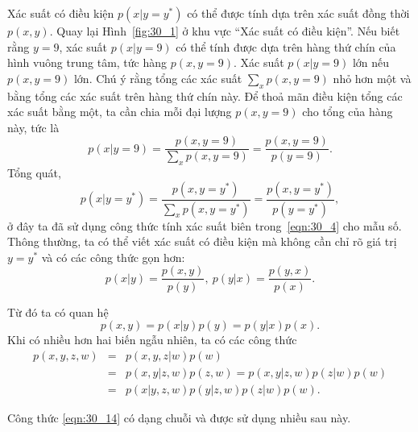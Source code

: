 Xác suất có điều kiện $p(x | y = y^*)$ có thể được tính dựa trên xác suất đồng
thời $p(x, y)$. Quay lại Hình~\ref{fig:30_1} ở khu vực ``Xác suất có điều
kiện''. Nếu biết rằng $y = 9$, xác suất $p(x | y = 9)$ có thể tính được dựa trên
hàng thứ chín của hình vuông trung tâm, tức hàng $p(x, y = 9)$. Xác suất $p(x | y =
9) $ lớn nếu $p(x, y= 9)$ lớn. Chú ý rằng tổng các xác suất $\sum_{x} p(x,
y = 9)$ nhỏ hơn một và bằng tổng các xác suất trên hàng thứ chín này. Để thoả
mãn điều kiện tổng các xác suất bằng một, ta cần chia mỗi đại lượng $p(x, y =
9)$ cho tổng của hàng này, tức là
\begin{equation}
p(x | y = 9) =\frac{p(x, y = 9)}{\sum \limits_x p(x, y = 9)} =
\frac{p(x, y = 9)}{p(y = 9)}.
\end{equation}
Tổng quát,
\begin{equation}
\label{eqn:30_9}
\displaystyle
p(x|y = y^*) = \frac{p(x, y = y^*)}{\sum \limits_{x} p(x, y = y^*)} =
\frac{p(x, y = y^*)}{p(y = y^*)},
\end{equation}
ở đây ta đã sử dụng công thức tính xác suất biên trong~\eqref{eqn:30_4} cho mẫu
số. Thông thường, ta có thể viết xác suất có điều kiện mà không cần chỉ rõ giá trị $y = y^*$ và có các công thức gọn hơn:
\begin{equation}
\label{eqn:30_2}
p(x |y) = \frac{p(x, y)}{p(y)}, ~p(y | x) = \frac{p(y, x)}{p(x)}.
\end{equation}

Từ đó ta có quan hệ
\begin{equation}
\label{eqn:30_11}
p(x, y) = p(x|y)p(y) = p(y | x) p(x).
\end{equation}
Khi có nhiều hơn hai biến ngẫu nhiên, ta có các công thức
\begin{eqnarray}
\label{eqn:30_12}
p(x, y, z, w)
& = & p(x, y, z | w) p(w) \\
\label{eqn:30_13}
& = & p(x, y | z, w)p(z, w) = p(x, y | z, w) p(z | w) p(w) \\
\label{eqn:30_14}
& = & p(x | y, z, w)p(y | z, w) p(z | w) p(w).
\end{eqnarray}

Công thức \eqref{eqn:30_14} có dạng {chuỗi} và được sử dụng nhiều sau
này.


